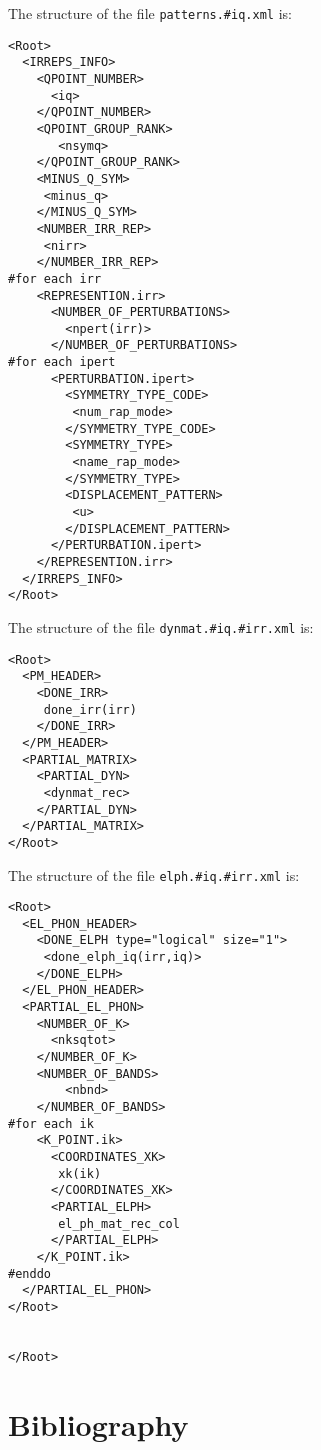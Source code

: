 \documentclass[12pt,a4paper]{article}
\begin{document}
The structure of the file \texttt{patterns.\#iq.xml} is:

\begin{verbatim}
<Root>
  <IRREPS_INFO>
    <QPOINT_NUMBER>
      <iq>
    </QPOINT_NUMBER>
    <QPOINT_GROUP_RANK>
       <nsymq>
    </QPOINT_GROUP_RANK>
    <MINUS_Q_SYM>
     <minus_q>
    </MINUS_Q_SYM>
    <NUMBER_IRR_REP>
     <nirr> 
    </NUMBER_IRR_REP>
#for each irr    
    <REPRESENTION.irr>
      <NUMBER_OF_PERTURBATIONS>
        <npert(irr)> 
      </NUMBER_OF_PERTURBATIONS>
#for each ipert
      <PERTURBATION.ipert>
        <SYMMETRY_TYPE_CODE>
         <num_rap_mode>
        </SYMMETRY_TYPE_CODE>
        <SYMMETRY_TYPE>
         <name_rap_mode>
        </SYMMETRY_TYPE>
        <DISPLACEMENT_PATTERN>
         <u>
        </DISPLACEMENT_PATTERN>
      </PERTURBATION.ipert>
    </REPRESENTION.irr>
  </IRREPS_INFO>
</Root>
\end{verbatim}

The structure of the file \texttt{dynmat.\#iq.\#irr.xml} is:

\begin{verbatim}
<Root>
  <PM_HEADER>
    <DONE_IRR>
     done_irr(irr)
    </DONE_IRR>
  </PM_HEADER>
  <PARTIAL_MATRIX>
    <PARTIAL_DYN>
     <dynmat_rec>
    </PARTIAL_DYN>
  </PARTIAL_MATRIX>
</Root>
\end{verbatim}

The structure of the file \texttt{elph.\#iq.\#irr.xml} is:

\begin{verbatim}
<Root>
  <EL_PHON_HEADER>
    <DONE_ELPH type="logical" size="1">
     <done_elph_iq(irr,iq)>
    </DONE_ELPH>
  </EL_PHON_HEADER>
  <PARTIAL_EL_PHON>
    <NUMBER_OF_K>
      <nksqtot> 
    </NUMBER_OF_K>
    <NUMBER_OF_BANDS>
        <nbnd> 
    </NUMBER_OF_BANDS>
#for each ik
    <K_POINT.ik>
      <COORDINATES_XK>
       xk(ik)
      </COORDINATES_XK>
      <PARTIAL_ELPH>
       el_ph_mat_rec_col 
      </PARTIAL_ELPH>
    </K_POINT.ik>
#enddo
  </PARTIAL_EL_PHON>
</Root>


</Root>
\end{verbatim}


\section{Bibliography}
\end{document}
